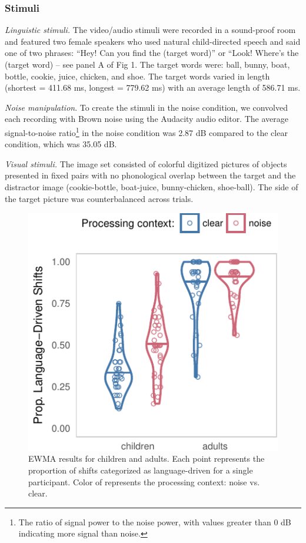 \documentclass[10pt, letterpaper]{article}
\newenvironment{CodeChunk}{}{}
\begin{document}
\subsubsection{Stimuli}\label{stimuli}

\emph{Linguistic stimuli.} The video/audio stimuli were recorded in a
sound-proof room and featured two female speakers who used natural
child-directed speech and said one of two phrases: ``Hey! Can you find
the (target word)'' or ``Look! Where's the (target word) -- see panel A
of Fig 1. The target words were: ball, bunny, boat, bottle, cookie,
juice, chicken, and shoe. The target words varied in length (shortest =
411.68 ms, longest = 779.62 ms) with an average length of 586.71 ms.

\emph{Noise manipulation}. To create the stimuli in the noise condition,
we convolved each recording with Brown noise using the Audacity audio
editor. The average signal-to-noise ratio\footnote{The ratio of signal
  power to the noise power, with values greater than 0 dB indicating
  more signal than noise.} in the noise condition was 2.87 dB compared
to the clear condition, which was 35.05 dB.

\emph{Visual stimuli.} The image set consisted of colorful digitized
pictures of objects presented in fixed pairs with no phonological
overlap between the target and the distractor image (cookie-bottle,
boat-juice, bunny-chicken, shoe-ball). The side of the target picture
was counterbalanced across trials.

\begin{CodeChunk}
\begin{figure}[t]

{\centering \includegraphics[width=0.8\linewidth]{figs/ewma_violin_plot-1} 

}

\caption[EWMA results for children and adults]{EWMA results for children and adults. Each point represents the proportion of shifts categorized as language-driven for a single participant. Color of represents the processing context: noise vs. clear.}\label{fig:ewma_violin_plot}
\end{figure}
\end{CodeChunk}
\end{document}
